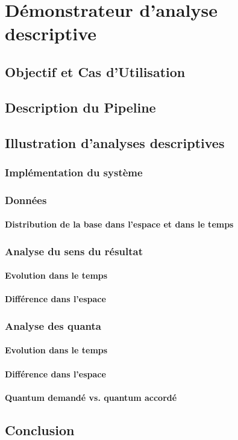 \chapter{Démonstrateur d'analyse descriptive}
\label{chap:demo}

\section{Objectif et Cas d'Utilisation}
\label{sec:demo:objectif}

\section{Description du Pipeline}
\label{sec:demo:motivation}

\section{Illustration d'analyses descriptives}
\label{sec:demo:experimentations}

\subsection{Implémentation du système}

\subsection{Données}
\subsubsection{Distribution de la base dans l'espace et dans le temps}

\subsection{Analyse du sens du résultat}
\subsubsection{Evolution dans le temps}
\subsubsection{Différence dans l'espace}

\subsection{Analyse des quanta}
\subsubsection{Evolution dans le temps}
\subsubsection{Différence dans l'espace}
\subsubsection{Quantum demandé vs. quantum accordé}

\section{Conclusion}
\label{sec:demo:conclusion}